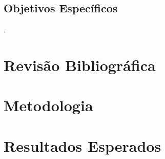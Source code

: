 \documentclass[a4paper, 11pt]{article}
\begin{document}
\vspace{1cm}
\subsection{Objetivos Específicos}

\lipsum[1-2].



\newpage
\section{Revisão Bibliográfica}

\lipsum[1-15]



\newpage
\section{Metodologia}

\lipsum[1-10]



\newpage
\section{Resultados Esperados}

\lipsum[1-7]
\end{document}
